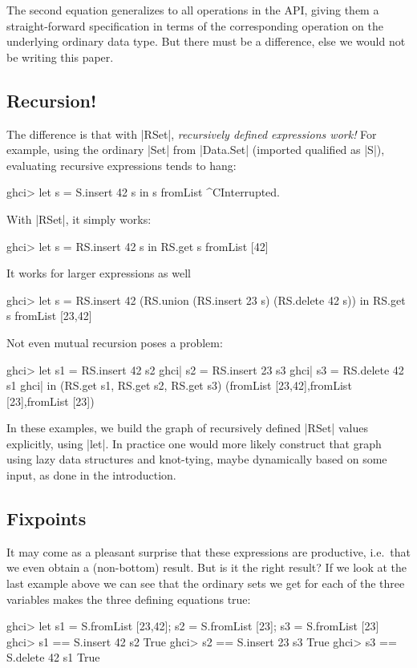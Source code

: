 \documentclass[manuscript,review,screen,acmsmall]{acmart}
\begin{document}
The second equation generalizes to all operations in the API, giving them a straight-forward specification in terms of the corresponding operation on the underlying ordinary data type. But there must be a difference, else we would not be writing this paper.

\subsection{Recursion!}

The difference is that with |RSet|, \emph{recursively defined expressions work!} For example, using the ordinary |Set| from |Data.Set| (imported qualified as |S|), evaluating recursive expressions tends to hang:
\begin{code}
ghci> let s = S.insert 42 s in s
fromList ^CInterrupted.
\end{code}
With |RSet|, it simply works:
\begin{code}
ghci> let s = RS.insert 42 s in RS.get s
fromList [42]
\end{code}
It works for larger expressions as well
\begin{code}
ghci> let s = RS.insert 42 (RS.union (RS.insert 23 s) (RS.delete 42 s)) in RS.get s
fromList [23,42]
\end{code}
Not even mutual recursion poses a problem:
\begin{code}
ghci> let  s1 = RS.insert 42 s2
ghci|      s2 = RS.insert 23 s3
ghci|      s3 = RS.delete 42 s1
ghci| in (RS.get s1, RS.get s2, RS.get s3)
(fromList [23,42],fromList [23],fromList [23])
\end{code}

In these examples, we build the graph of recursively defined |RSet| values explicitly, using |let|. In practice one would more likely construct that graph using lazy data structures and knot-tying, maybe dynamically based on some input, as done in the introduction.

\subsection{Fixpoints}

It may come as a pleasant surprise that these expressions are productive, i.e.\ that we even obtain a (non-bottom) result. But is it the right result? If we look at the last example above we can see that the ordinary sets we get for each of the three variables makes the three defining equations true:
\begin{code}
ghci> let s1 = S.fromList [23,42]; s2 = S.fromList [23]; s3 = S.fromList [23]
ghci> s1 == S.insert 42 s2
True
ghci> s2 == S.insert 23 s3
True
ghci> s3 == S.delete 42 s1
True
\end{code}
\end{document}
